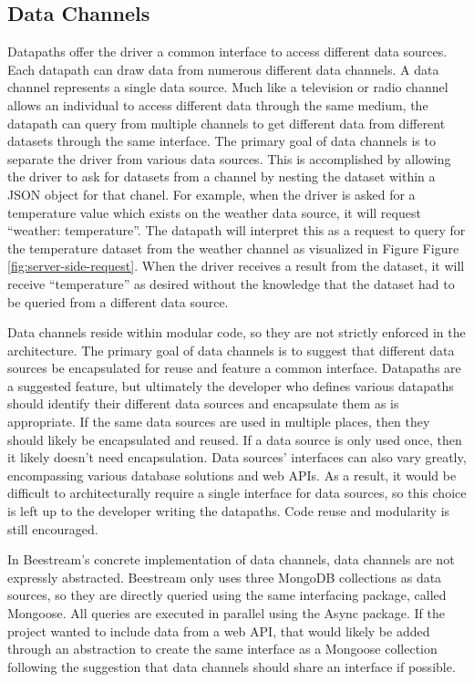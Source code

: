 \subsection{Data Channels}
Datapaths offer the driver a common interface to access different data sources.  Each datapath can draw data from numerous different data channels.  A data channel represents a single data source.  Much like a television or radio channel allows an individual to access different data through the same medium, the datapath can query from multiple channels to get different data from different datasets through the same interface.  The primary goal of data channels is to separate the driver from various data sources.  This is accomplished by allowing the driver to ask for datasets from a channel by nesting the dataset within a JSON object for that chanel.  For example, when the driver is asked for a temperature value which exists on the weather data source, it will request “weather: {temperature}”.  The datapath will interpret this as a request to query for the temperature dataset from the weather channel as visualized in Figure Figure \ref{fig:server-side-request}.  When the driver receives a result from the dataset, it will receive “temperature” as desired without the knowledge that the dataset had to be queried from a different data source. \par
Data channels reside within modular code, so they are not strictly enforced in the architecture.  The primary goal of data channels is to suggest that different data sources be encapsulated for reuse and feature a common interface.  Datapaths are a suggested feature, but ultimately the developer who defines various datapaths should identify their different data sources and encapsulate them as is appropriate.  If the same data sources are used in multiple places, then they should likely be encapsulated and reused.  If a data source is only used once, then it likely doesn’t need encapsulation.  Data sources’ interfaces can also vary greatly, encompassing various database solutions and web APIs.  As a result, it would be difficult to architecturally require a single interface for data sources, so this choice is left up to the developer writing the datapaths.  Code reuse and modularity is still encouraged. \par
In Beestream’s concrete implementation of data channels, data channels are not expressly abstracted.  Beestream only uses three MongoDB collections as data sources, so they are directly queried using the same interfacing package, called Mongoose.  All queries are executed in parallel using the Async package.  If the project wanted to include data from a web API, that would likely be added through an abstraction to create the same interface as a Mongoose collection following the suggestion that data channels should share an interface if possible. \par


